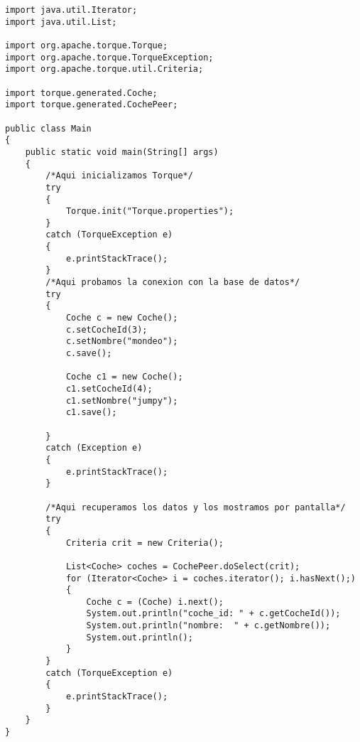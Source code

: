 \begin{lstlisting}
import java.util.Iterator;
import java.util.List;

import org.apache.torque.Torque;
import org.apache.torque.TorqueException;
import org.apache.torque.util.Criteria;

import torque.generated.Coche;
import torque.generated.CochePeer;

public class Main 
{
	public static void main(String[] args)
	{
		/*Aqui inicializamos Torque*/
		try
		{
			Torque.init("Torque.properties");
		} 
		catch (TorqueException e) 
		{	
			e.printStackTrace();
		}
		/*Aqui probamos la conexion con la base de datos*/
		try 
		{
			Coche c = new Coche();
			c.setCocheId(3);
			c.setNombre("mondeo");
			c.save();

			Coche c1 = new Coche();
			c1.setCocheId(4);
			c1.setNombre("jumpy");
			c1.save();

		} 
		catch (Exception e) 
		{
			e.printStackTrace();
		}

		/*Aqui recuperamos los datos y los mostramos por pantalla*/
		try 
		{
			Criteria crit = new Criteria();

			List<Coche> coches = CochePeer.doSelect(crit);
			for (Iterator<Coche> i = coches.iterator(); i.hasNext();)
			{
				Coche c = (Coche) i.next();
				System.out.println("coche_id: " + c.getCocheId());
				System.out.println("nombre:  " + c.getNombre()); 
				System.out.println();
			}
		} 
		catch (TorqueException e) 
		{
			e.printStackTrace();
		}
	}
}
\end{lstlisting}